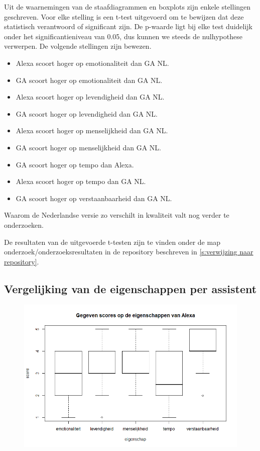 Uit de waarnemingen van de staafdiagrammen en boxplots zijn enkele stellingen geschreven. Voor elke stelling is een t-test uitgevoerd om te bewijzen dat deze statistisch verantwoord of significant zijn. De p-waarde ligt bij elke test duidelijk onder het significantieniveau van 0.05, dus kunnen we steeds de nulhypothese verwerpen. De volgende stellingen zijn bewezen.
\begin{itemize}
    \item Alexa scoort hoger op emotionaliteit dan \gls{GA NL}.
    \item \gls{GA} scoort hoger op emotionaliteit dan \gls{GA NL}.
    \item Alexa scoort hoger op levendigheid dan \gls{GA NL}.
    \item \gls{GA} scoort hoger op levendigheid dan \gls{GA NL}.
    \item Alexa scoort hoger op menselijkheid dan \gls{GA NL}.
    \item \gls{GA} scoort hoger op menselijkheid dan \gls{GA NL}.
    \item \gls{GA} scoort hoger op tempo dan Alexa.
    \item Alexa scoort hoger op tempo dan \gls{GA NL}.
    \item \gls{GA} scoort hoger op verstaanbaarheid dan \gls{GA NL}.
\end{itemize}
Waarom de Nederlandse versie zo verschilt in kwaliteit valt nog verder te onderzoeken.

De resultaten van de uitgevoerde t-testen zijn te vinden onder de map onderzoek/onderzoeksresultaten in de repository beschreven in \ref{s:verwijzing naar repository}.

\subsection{Vergelijking van de eigenschappen per assistent}
\begin{figure}[H]
    \centering
    \includegraphics[width=0.9\linewidth]{../onderzoek/onderzoeksresultaten/vergelijking_eigenschappen_per_assistent/boxplot_score_eigenschappen_alexa}
    \caption{}
    \label{fig:boxplot-alexa}
\end{figure}

